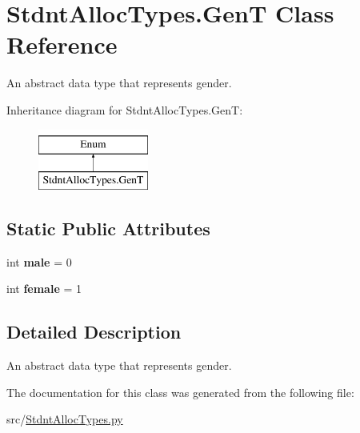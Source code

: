 \hypertarget{class_stdnt_alloc_types_1_1_gen_t}{}\section{Stdnt\+Alloc\+Types.\+GenT Class Reference}
\label{class_stdnt_alloc_types_1_1_gen_t}


An abstract data type that represents gender.  


Inheritance diagram for Stdnt\+Alloc\+Types.\+GenT\+:\begin{figure}[H]
\begin{center}
\leavevmode
\includegraphics[height=2.000000cm]{class_stdnt_alloc_types_1_1_gen_t}
\end{center}
\end{figure}
\subsection*{Static Public Attributes}
\begin{DoxyCompactItemize}
\item 
\mbox{\label{class_stdnt_alloc_types_1_1_gen_t_a5b77316ca7d9bd45536ba8aee60c38ca}} 
int {\bfseries male} = 0
\item 
\mbox{\label{class_stdnt_alloc_types_1_1_gen_t_a5a66e845b4cfb687f41c243be4917664}} 
int {\bfseries female} = 1
\end{DoxyCompactItemize}


\subsection{Detailed Description}
An abstract data type that represents gender. 

The documentation for this class was generated from the following file\+:\begin{DoxyCompactItemize}
\item 
src/\mbox{\hyperlink{_stdnt_alloc_types_8py}{Stdnt\+Alloc\+Types.\+py}}\end{DoxyCompactItemize}
